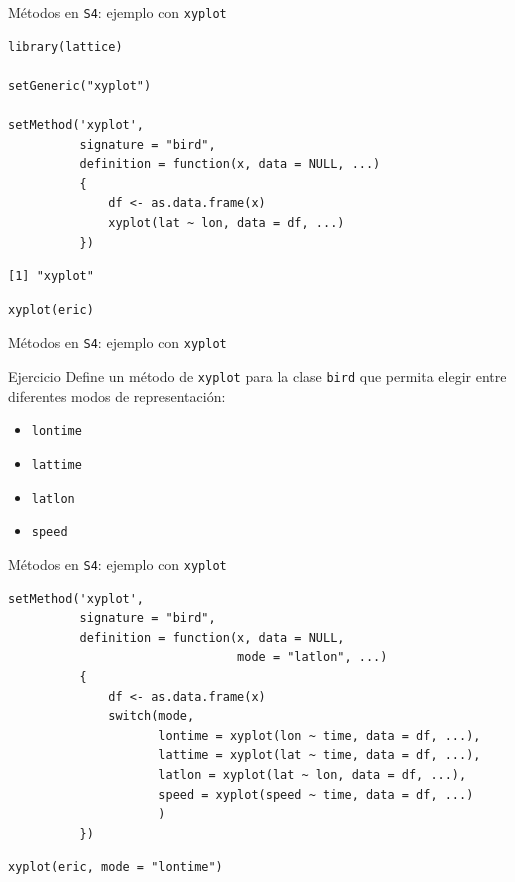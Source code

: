 \documentclass[xcolor={usenames,svgnames,dvipsnames}]{beamer}
\begin{document}
\begin{frame}[label={sec:org34b24c0},fragile]{Métodos en \texttt{S4}: ejemplo con \texttt{xyplot}}
 \lstset{language=r,label= ,caption= ,captionpos=b,numbers=none}
\begin{lstlisting}
library(lattice)

setGeneric("xyplot")

setMethod('xyplot',
          signature = "bird",
          definition = function(x, data = NULL, ...)
          {
              df <- as.data.frame(x)
              xyplot(lat ~ lon, data = df, ...)
          })    
\end{lstlisting}

\begin{verbatim}
[1] "xyplot"
\end{verbatim}


\lstset{language=r,label= ,caption= ,captionpos=b,numbers=none}
\begin{lstlisting}
xyplot(eric)
\end{lstlisting}
\end{frame}


\begin{frame}[label={sec:org5d4630a},fragile]{Métodos en \texttt{S4}: ejemplo con \texttt{xyplot}}
 \begin{block}{Ejercicio}
Define un método de \texttt{xyplot} para la clase \texttt{bird} que permita elegir entre diferentes modos de representación:
\begin{itemize}
\item \texttt{lontime}
\item \texttt{lattime}
\item \texttt{latlon}
\item \texttt{speed}
\end{itemize}
\end{block}
\end{frame}

\begin{frame}[label={sec:orgb822975},fragile]{Métodos en \texttt{S4}: ejemplo con \texttt{xyplot}}
 \lstset{language=r,label= ,caption= ,captionpos=b,numbers=none}
\begin{lstlisting}
setMethod('xyplot',
          signature = "bird",
          definition = function(x, data = NULL,
                                mode = "latlon", ...)
          {
              df <- as.data.frame(x)
              switch(mode,
                     lontime = xyplot(lon ~ time, data = df, ...),
                     lattime = xyplot(lat ~ time, data = df, ...),
                     latlon = xyplot(lat ~ lon, data = df, ...),
                     speed = xyplot(speed ~ time, data = df, ...)
                     )
          })    
\end{lstlisting}

\lstset{language=r,label= ,caption= ,captionpos=b,numbers=none}
\begin{lstlisting}
xyplot(eric, mode = "lontime")
\end{lstlisting}
\end{frame}
\end{document}
